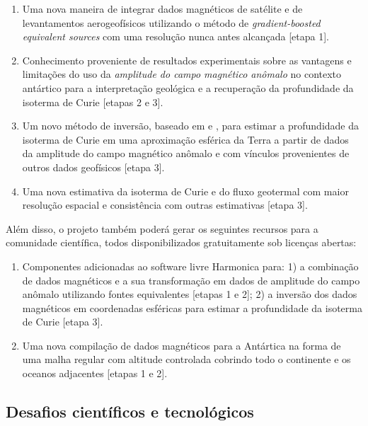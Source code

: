 \documentclass[11pt,a4paper,oneside]{book}
\begin{document}
\begin{enumerate}
  \item Uma nova maneira de integrar dados magnéticos de satélite e de
    levantamentos aerogeofísicos utilizando o método de
    \textit{gradient-boosted equivalent sources} \citep{Soler2021} com uma
    resolução nunca antes alcançada [etapa 1].
  \item Conhecimento proveniente de resultados experimentais sobre as vantagens
    e limitações do uso da \textit{amplitude do campo magnético anômalo} no
    contexto antártico para a interpretação geológica \citep{Melo2021} e a
    recuperação da profundidade da isoterma de Curie \citep{HidalgoGato2021}
    [etapas 2 e 3].
  \item Um novo método de inversão, baseado em \citet{Uieda2017} e
    \citet{HidalgoGato2021}, para estimar a profundidade da isoterma de Curie
    em uma aproximação esférica da Terra a partir de dados da amplitude do
    campo magnético anômalo e com vínculos provenientes de outros dados
    geofísicos [etapa 3].
  \item Uma nova estimativa da isoterma de Curie e do fluxo geotermal com maior
    resolução espacial e consistência com outras estimativas [etapa 3].
\end{enumerate}

\noindent
Além disso, o projeto também poderá gerar os seguintes recursos para a
comunidade científica, todos disponibilizados gratuitamente sob licenças
abertas:

\begin{enumerate}
  \item Componentes adicionadas ao software livre Harmonica para:
    1) a combinação de dados magnéticos e a sua transformação em dados de
       amplitude do campo anômalo utilizando fontes equivalentes [etapas 1 e
       2];
    2) a inversão dos dados magnéticos em coordenadas esféricas para estimar a
       profundidade da isoterma de Curie [etapa 3].
  \item Uma nova compilação de dados magnéticos para a Antártica na forma de
    uma malha regular com altitude controlada cobrindo todo o continente e os
    oceanos adjacentes [etapas 1 e 2].
\end{enumerate}

\subsection{Desafios científicos e tecnológicos}
\end{document}
